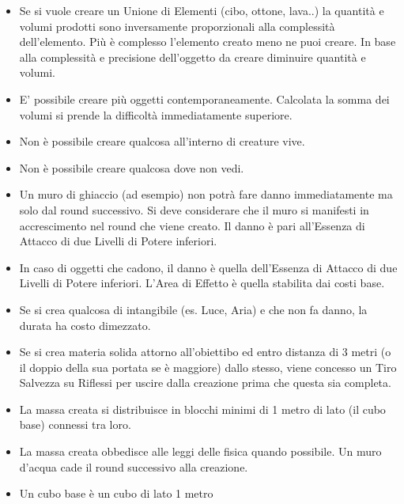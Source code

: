 \documentclass[a4paper,11pt,twoside,openany]{book}
\begin{document}
\begin{itemize}
	\item Se si vuole creare un Unione di Elementi (cibo, ottone, lava..) la quantità e volumi prodotti sono inversamente proporzionali alla complessità dell'elemento. Più è complesso l'elemento creato meno ne puoi creare. In base alla complessità e precisione dell'oggetto da creare diminuire quantità e volumi.
	\item E' possibile creare più oggetti contemporaneamente. Calcolata la somma dei volumi si prende la difficoltà immediatamente superiore.
	\item Non è possibile creare qualcosa all'interno di creature vive.
	\item Non è possibile creare qualcosa dove non vedi.
	\item Un muro di ghiaccio (ad esempio) non potrà fare danno immediatamente ma solo dal round successivo. Si deve considerare che il muro si manifesti in accrescimento nel round che viene creato. Il danno è pari all'Essenza di Attacco di due Livelli di Potere inferiori.
	\item In caso di oggetti che cadono, il danno è quella dell'Essenza di Attacco di due Livelli di Potere inferiori. L'Area di Effetto è quella stabilita dai costi base.
	\item Se si crea qualcosa di intangibile (es. Luce, Aria) e che non fa danno, la durata ha costo dimezzato.
	\item Se si crea materia solida attorno all'obiettibo ed entro distanza di 3 metri (o il doppio della sua portata se è maggiore) dallo stesso, viene concesso un Tiro Salvezza su Riflessi per uscire dalla creazione prima che questa sia completa.
	\item La massa creata si distribuisce in blocchi minimi di 1 metro di lato (il cubo base) connessi tra loro.
	\item La massa creata obbedisce alle leggi delle fisica quando possibile. Un muro d'acqua cade il round successivo alla creazione.
	\item Un cubo base è un cubo di lato 1 metro
\end{itemize}

\medskip
\end{document}
